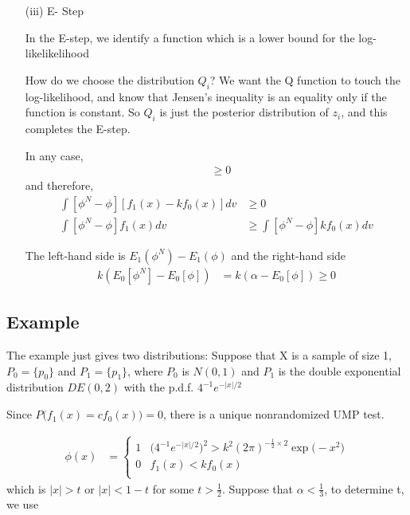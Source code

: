 \documentclass[11pt]{article} %
\begin{document}
\begin{itemize}
\item[(iii)] E- Step

In the E-step, we identify a function which is a lower bound for the log-likelikelihood

How do we choose the distribution $Q_i$? We want the Q function to touch the log-likelihood, and know that Jensen’s inequality is an equality only if the function is constant. So $Q_i$
 is just the posterior distribution of $z_i$, and this completes the E-step.

In any case, 
\begin{align*}
	[\phi^N - \phi] [f_1(x) - k f_0(x)] & \geq 0
\end{align*}
and therefore,
\begin{align*}
	\int [\phi^N - \phi] [f_1(x) - k f_0(x)] dv& \geq 0 \\
	\int [\phi^N - \phi] f_1(x) dv & \geq \int [\phi^N - \phi]  k f_0(x) dv
\end{align*}

The left-hand side is $E_1(\phi^N) - E_1(\phi) $ and the right-hand side 
\begin{align*}
	k (E_0 [\phi^N]  - E_0[ \phi] ) &= k (\alpha - E_0[ \phi]) \geq 0
\end{align*}

\end{itemize}

\subsection{Example}
The example just gives two distributions: Suppose that X is a sample of size 1, $P_0 = \{ p_0\}$ and $P_1 = \{ p_1\}$, where $P_0$ is $N(0,1)$ and $P_1$ is the double exponential distribution $DE(0,2)$ with the p.d.f. $4^{-1} e^{-|x|/2}$

Since $P \Big( f_1(x) = cf_0(x) \Big) = 0$, there is a unique nonrandomized UMP test.

\begin{align*}
	\phi(x) &= \begin{cases}
	 1 & \Big( 4^{-1} e^{-|x|/2} \Big)^2 > k^2 (2\pi)^{-\frac{1}{2} \times 2} \exp \Big( -x^2 \Big) \\
	 0 & f_1(x) < k f_0(x) \\
	\end{cases}
\end{align*}
which is $|x| > t$ or $|x| < 1-t$ for some $t > \frac{1}{2}$. Suppose that $\alpha < \frac{1}{3}$, to determine t, we use
\end{document}
